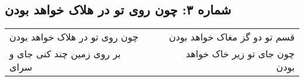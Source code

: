 \begin{center}
\section*{شماره ۳: چون روی تو در هلاک خواهد بودن}
\label{sec:003}
\begin{longtable}{l p{0.5cm} r}
چون روی تو در هلاک خواهد بودن
&&
قسم تو دو گز مغاک خواهد بودن
\\
بر روی زمین چند کنی جای و سرای
&&
چون جای تو زیر خاک خواهد بودن
\\
\end{longtable}
\end{center}
